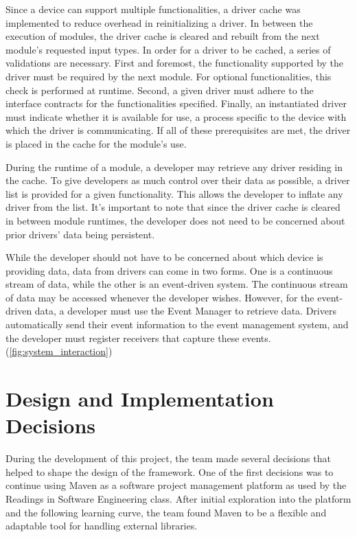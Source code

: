 \documentclass[11pt,letterpaper]{article}
\begin{document}
	Since a device can support multiple functionalities, a driver cache was 
	implemented to reduce overhead in reinitializing a driver. In between the 
	execution of modules, the driver cache is cleared and rebuilt from the 
	next module's requested input types. In order for a driver to be cached, a 
	series of validations are necessary. First and foremost, the functionality 
	supported by the driver must be required by the next module. For 
	optional functionalities, this check is performed at runtime. Second, a 
	given driver must adhere to the interface contracts for the 
	functionalities specified. Finally, an instantiated driver must indicate 
	whether it is available for use, a process specific to the device with 
	which the driver is communicating. If all of these prerequisites are met, 
	the driver is placed in the cache for the module's use. 

	During the runtime of a module, a developer may retrieve any driver 
	residing in the cache. To give developers as much control over their data 
	as possible, a driver list is provided for a given functionality. This 
	allows the developer to inflate any driver from the list. It's important 
	to note that since the driver cache is cleared in between module runtimes, 
	the developer does not need to be concerned about prior drivers' data 
	being persistent.

	While the developer should not have to be concerned about which device is 
	providing data, data from drivers can come in two forms. One is a 
	continuous stream of data, while the other is an event-driven system. The 
	continuous stream of data may be accessed whenever the developer wishes. 
	However, for the event-driven data, a developer must use the Event Manager 
	to retrieve data. Drivers automatically send their event information to 
	the event management system, and the developer must register receivers 
	that capture these events.
	(\autoref{fig:system_interaction})

	\pagebreak
   
	\section{Design and Implementation Decisions}

	During the development of this project, the team made several decisions that
	helped to shape the design of the framework. One of the first decisions was to
	continue using Maven as a software project management platform as used by the
	Readings in Software Engineering class. After initial exploration into the
	platform and the following learning curve, the team found Maven to be a
	flexible and adaptable tool for handling external libraries.
\end{document}
